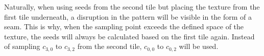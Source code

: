 \begin{figure}[H]
    \label{img:tikz:noise:seamless:2}
\end{figure}

\noindent
Naturally, when using seeds from the second tile but placing the texture from the first tile underneath, a disruption in the pattern will be visible in the form of a seam.
This is why, when the sampling point exceeds the defined space of the texture, the seeds will always be calculated based on the first tile again.
Instead of sampling $c_{3,0}$ to $c_{3,2}$ from the second tile, $c_{0,0}$ to $c_{0,2}$ will be used.

